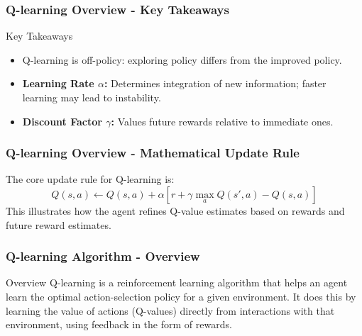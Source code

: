 \documentclass[aspectratio=169]{beamer}
\begin{document}
\begin{frame}[fragile]
    \frametitle{Q-learning Overview - Key Takeaways}
    \begin{block}{Key Takeaways}
        \begin{itemize}
            \item Q-learning is off-policy: exploring policy differs from the improved policy.
            \item \textbf{Learning Rate \( \alpha \):} Determines integration of new information; faster learning may lead to instability.
            \item \textbf{Discount Factor \( \gamma \):} Values future rewards relative to immediate ones.
        \end{itemize}
    \end{block}
\end{frame}

\begin{frame}[fragile]
    \frametitle{Q-learning Overview - Mathematical Update Rule}
    The core update rule for Q-learning is:
    \begin{equation}
    Q(s, a) \leftarrow Q(s, a) + \alpha \left[ r + \gamma \max_a Q(s', a) - Q(s, a) \right]
    \end{equation}
    This illustrates how the agent refines Q-value estimates based on rewards and future reward estimates.
\end{frame}

\begin{frame}[fragile]
    \frametitle{Q-learning Algorithm - Overview}
    \begin{block}{Overview}
        Q-learning is a reinforcement learning algorithm that helps an agent learn the optimal action-selection policy for a given environment. It does this by learning the value of actions (Q-values) directly from interactions with that environment, using feedback in the form of rewards.
    \end{block}
\end{frame}
\end{document}
